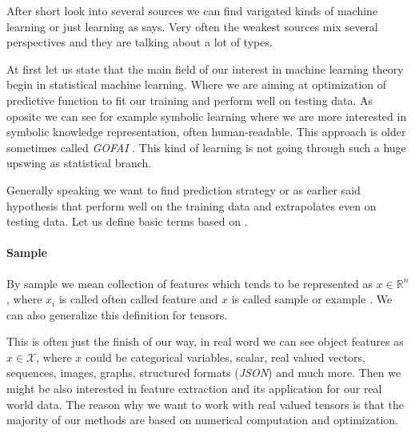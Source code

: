  \cite{Russell2009}

After short look into several sources we can find varigated kinds of machine learning or just learning as \cite{Russell2009} says. Very often the weakest sources mix several perspectives and they are talking about a lot of types.

At first let us state that the main field of our interest in machine learning theory begin in statistical machine learning. Where we are aiming at optimization of predictive function to fit our training and perform well on testing data. As oposite we can see for example symbolic learning where we are more interested in symbolic knowledge representation, often human-readable. This approach is older sometimes called \emph{GOFAI} \cite{Haugeland1985}. This kind of learning is not going through such a huge upswing as statistical branch.

Generally speaking we want to find prediction strategy or as earlier said hypothesis that perform well on the training data and extrapolates even on testing data. Let us define basic terms based on \cite{Franc2020}.


\paragraph{Sample}
By sample we mean collection of features which tends to be represented as $x\in\mathbb{R}^{n}$, where $x_i$ is called often called feature and $x$ is called sample or example \cite{GoodBengCour16}. We can also generalize this definition for tensors.

This is often just the finish of our way, in real word we can see object features as $x \in \mathcal{X}$, where $x$ could be categorical variables, scalar, real valued vectors, sequences, images, graphs, structured formats (\emph{JSON}) and much more. Then we might be also interested in feature extraction and its application for our real world data. The reason why we want to work with real valued tensors is that the majority of our methods are based on numerical computation and optimization. 
